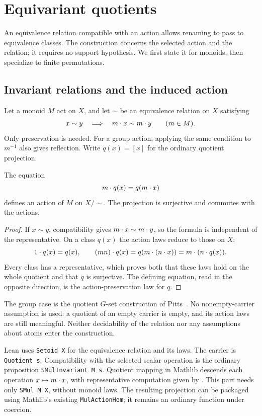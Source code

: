 \section{Equivariant quotients}
\label{sec:equivariant-quotients}

An equivalence relation compatible with an action allows renaming to pass
to equivalence classes. The construction concerns the selected action and
the relation; it requires no support hypothesis. We first state it for
monoids, then specialize to finite permutations.

\subsection{Invariant relations and the induced action}

Let a monoid $M$ act on $X$, and let $\sim$ be an equivalence relation on
$X$ satisfying
\[
  x\sim y\quad\Longrightarrow\quad m\mathbin{\cdot} x\sim m\mathbin{\cdot} y
  \qquad(m\in M).
\]
Only preservation is needed. For a group action, applying the same
condition to $m^{-1}$ also gives reflection. Write $q(x)=[x]$ for the
ordinary quotient projection.

\begin{proposition}
\label{prop:quotient-action}
The equation
\[
  m\mathbin{\cdot} q(x)=q(m\mathbin{\cdot} x)
\]
defines an action of $M$ on $X/{\sim}$. The projection is surjective and
commutes with the actions.
\end{proposition}

\begin{proof}
If $x\sim y$, compatibility gives $m\mathbin{\cdot} x\sim m\mathbin{\cdot} y$, so the
formula is independent of the representative. On a class $q(x)$ the
action laws reduce to those on $X$:
\[
  1\mathbin{\cdot} q(x)=q(x),\qquad
  (mn)\mathbin{\cdot} q(x)=q(m\mathbin{\cdot}(n\mathbin{\cdot} x))=m\mathbin{\cdot}(n\mathbin{\cdot} q(x)).
\]
Every class has a representative, which proves both that these laws hold
on the whole quotient and that $q$ is surjective. The defining equation,
read in the opposite direction, is the action-preservation law for $q$.
\end{proof}

The group case is the quotient $G$-set construction of
Pitts~\cite[Section~1.7, equation~(1.43)]{pitts2013}. No nonempty-carrier
assumption is used: a quotient of an empty carrier is empty, and its
action laws are still meaningful. Neither decidability of the relation
nor any assumptions about atoms enter the construction.

Lean uses \texttt{Setoid X} for the equivalence relation and its laws.
The carrier is \texttt{Quotient s}.
Compatibility with the selected scalar operation is the ordinary
proposition \texttt{SMulInvariant M s}.
Quotient mapping in Mathlib descends each operation
$x\mapsto m\mathbin{\cdot} x$, with representative computation given by
. This part needs only \texttt{SMul M X},
without monoid laws. The resulting projection can be packaged using
Mathlib's existing \texttt{MulActionHom}; it remains an ordinary function
under coercion.

